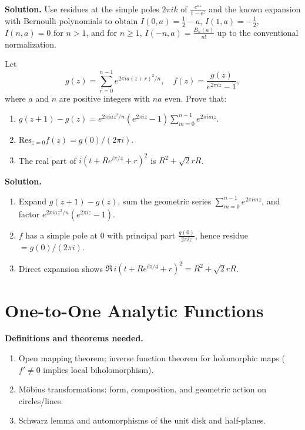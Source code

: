\noindent\textbf{Solution.}
Use residues at the simple poles $2\pi i k$ of $\frac{e^{az}}{1-e^z}$ and the known expansion with Bernoulli polynomials to obtain $I(0,a)=\tfrac12-a$, $I(1,a)=-\tfrac12$, $I(n,a)=0$ for $n>1$, and for $n\ge1$, $I(-n,a)=\tfrac{B_n(a)}{n!}$ up to the conventional normalization.

\begin{problembox}
Let
\[ g(z) = \sum_{r=0}^{n-1} e^{2\pi i a (z + r)^2 / n}, \quad f(z) = \frac{g(z)}{e^{2\pi i z} - 1}, \]
where \( a \) and \( n \) are positive integers with \( na \) even. Prove that:
\begin{enumerate}[label=(\alph*)]
\item \( g(z + 1) - g(z) = e^{2\pi i a z^2 / n} (e^{2\pi i z} - 1) \sum_{m=0}^{n-1} e^{2\pi i m z}. \)
\item \( \text{Res}_{z=0} f(z) = g(0) / (2\pi i). \)
\item The real part of \( i (t + R e^{i\pi / 4} + r)^2 \) is \( R^2 + \sqrt{2} r R \).
\end{enumerate}
\end{problembox}

\noindent\textbf{Solution.}
\begin{enumerate}[label=(\alph*)]
\item Expand $g(z+1)-g(z)$, sum the geometric series $\sum_{m=0}^{n-1}e^{2\pi i m z}$, and factor $e^{2\pi i a z^2/n}(e^{2\pi i z}-1)$.
\item $f$ has a simple pole at $0$ with principal part $\frac{g(0)}{2\pi i z}$, hence residue $=g(0)/(2\pi i)$.
\item Direct expansion shows $\Re\,i(t+Re^{i\pi/4}+r)^2=R^2+\sqrt2 rR$.
\end{enumerate}

\section{One-to-One Analytic Functions}

\noindent\textbf{Definitions and theorems needed.}
\begin{enumerate}[label=(\alph*)]
\item Open mapping theorem; inverse function theorem for holomorphic maps ($f'\ne0$ implies local biholomorphism).
\item Möbius transformations: form, composition, and geometric action on circles/lines.
\item Schwarz lemma and automorphisms of the unit disk and half-planes.
\end{enumerate}

